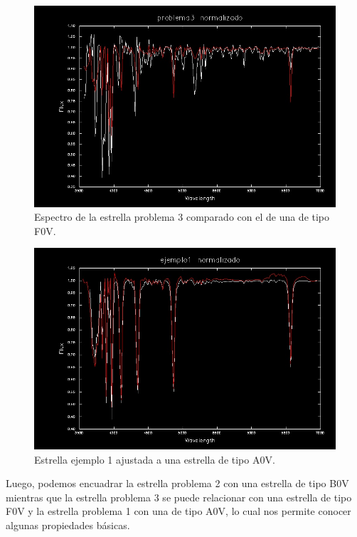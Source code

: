 \documentclass{aa} %
\begin{document}
\begin{figure}[h!]
\begin{center}
\includegraphics[scale=0.3]{3 ajustado.png}
\caption{Espectro de la estrella problema 3 comparado con el de una de tipo F0V.}
\label{fig:ajuste2}
\end{center}
\end{figure}

\begin{figure}[h!]
\begin{center}
\includegraphics[scale=0.3]{1 ajustado.png}
\caption{Estrella ejemplo 1 ajustada a una estrella de tipo A0V.}
\label{fig:ajuste3}
\end{center}
\end{figure}

Luego, podemos encuadrar la estrella problema 2 con una estrella de tipo B0V mientras que la estrella problema 3 se puede relacionar con una estrella de tipo F0V y la estrella problema 1 con una de tipo A0V, lo cual nos permite conocer algunas propiedades básicas.
\end{document}
